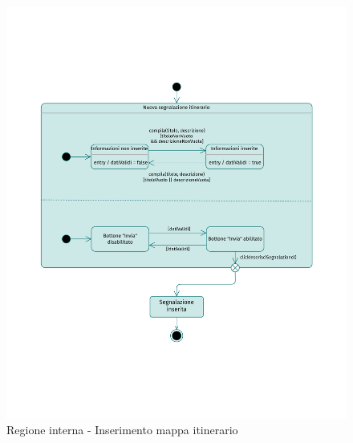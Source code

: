 \documentclass{natourDoc}
\begin{document}
\newpage
\begin{figure}[!htbp]
	\centering
	\includegraphics[width=\textwidth, page=4]{./diagrams/statechart.pdf}
	\caption{Regione interna - Inserimento mappa itinerario}
\end{figure}
\FloatBarrier
\end{document}
